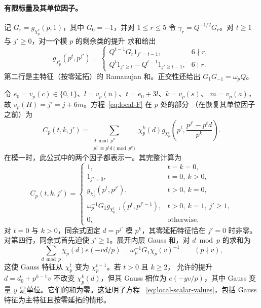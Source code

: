 \paragraph{有限标量及其单位因子。}
记 $G_r=g_{\chi_p^r}(p,1)$，其中 $G_0=-1$，并对 $1\le r\le5$ 令
$\gamma_r=Q^{-1/2}G_r$。对 $t\ge1$ 与 $j'\ge0$，对一个模 $p$ 的剩余类的提升
求和给出
\[
 g_{\chi_p^r}(p^t,p^{j'})=
 \begin{cases}
 Q^{t-1}G_r1_{j'=t-1},&6\nmid r,\\
 Q^t1_{j'\ge t}-Q^{t-1}1_{j'\ge t-1},&6\mid r.
 \end{cases}
\]
第二行是主特征（按零延拓）的 Ramanujan 和。正交性还给出
$G_1G_{-1}=\omega_pQ$。

令 $e_0=v_p(c)\in\{0,1\}$、$l=v_p(n)$、$t=e_0+3l$、$k=v_p(s)$、
$m=v_p(a)$，故 $v_p(H)=j'=j+6m$。方程~\eqref{eq:local-F} 在 $p$ 处的部分
（在恢复其单位因子之前）为
\begin{equation}\label{eq:local-scalar-definition}
 C_p(t,k,j')=
 \sum_{\substack{d\bmod p^k\\p^{j'}\equiv p^td\pmod{p^k}}}
 \chi_p^k(d)
 g_{\chi_p^t}\!\left(p^t,\frac{p^{j'}-p^td}{p^k}\right).
\end{equation}
在模一时，此公式中的两个因子都表示一。其完整计算为
\begin{equation}\label{eq:local-scalar-values}
 C_p(t,k,j')=
 \begin{cases}
 1,&t=k=0,\\
 1_{j'=0},&t=0,\ k>0,\\
 g_{\chi_p^t}(p^t,p^{j'}),&t>0,\ k=0,\\
 \omega_p^{-1}G_1g_{\chi_p^{t-1}}(p^t,p^{j'-1}),
                      &t>0,\ k=1,\ j'\ge1,\\
 0,&\text{otherwise}.
 \end{cases}
\end{equation}
对 $t=0$ 与 $k>0$，同余式固定 $d=p^{j'}$ 模 $p^k$，其零延拓特征恰在
$j'=0$ 时非零。对第四行，同余式首先迫使 $j'\ge1$。展开内层 Gauss 和，对
$d\bmod p$ 的求和为
\[
 \sum_{d\bmod p}\chi_p(d)e(-vd/p)
       =\omega_p^{-1}G_1\chi_p(v)^{-1}
       \qquad(p\nmid v),
\]
这使 Gauss 特征从 $\chi_p^t$ 变为 $\chi_p^{t-1}$。若 $t>0$ 且 $k\ge2$，
允许的提升 $d=d_0+p^{k-1}v$ 不改变 $\chi_p^k(d)$，但其 Gauss 相位为
$e(-yv/p)$，其中 Gauss 变量 $y$ 是单位。它们的和为零。这证明了方程
~\eqref{eq:local-scalar-values}，包括 Gauss 特征为主特征且按零延拓的情形。
